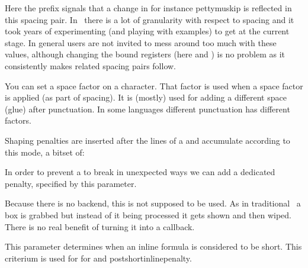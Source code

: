 \starttyping
\inherited\setmathspacing
  \mathimplicationcode \mathbinarycode
  \alldisplaystyles \thickermuskip
\inherited\setmathspacing
  \mathradicalcode \mathmiddlecode
  \allunsplitstyles \pettymuskip
\stoptyping

Here the  prefix signals that a change in for instance \prm
{pettymuskip} is reflected in this spacing pair. In \CONTEXT\ there is a lot of
granularity with respect to spacing and it took years of experimenting (and
playing with examples) to get at the current stage. In general users are not
invited to mess around too much with these values, although changing the bound
registers (here  and ) is no problem as it
consistently makes related spacing pairs follow.

\stopnewprimitive

\startoldprimitive[title={\prm {sfcode}}]

You can set a space factor on a character. That factor is used when a space
factor is applied (as part of spacing). It is (mostly) used for adding a
different space (glue) after punctuation. In some languages different punctuation
has different factors.

\stopoldprimitive

\startnewprimitive[title={\prm {shapingpenaltiesmode}}]

Shaping penalties are inserted after the lines of a  and
accumulate according to this mode, a bitset of:


\stopnewprimitive

\startnewprimitive[title={\prm {shapingpenalty}}]

In order to prevent a  to break in unexpected ways we can add a
dedicated penalty, specified by this parameter.

\stopnewprimitive

\startoldprimitive[title={\prm {shipout}}][obsolete=yes]

Because there is no backend, this is not supposed to be used. As in traditional
\TEX\ a box is grabbed but instead of it being processed it gets shown and then
wiped. There is no real benefit of turning it into a callback.

\stopoldprimitive

\startnewprimitive[title={\prm {shortinlinemaththreshold}}]

This parameter determines when an inline formula is considered to be short. This
criterium is used for for  and \prm
{postshortinlinepenalty}.

